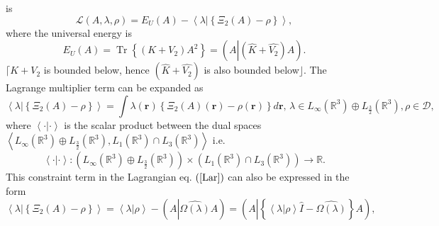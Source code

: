 \documentclass[aps,preprint]{revtex4}%
\begin{document}
is
\begin{equation}
\mathcal{L}\left(  A,\lambda,\rho\right)  =E_{U}\left(  A\right)
-\left\langle \left.  \lambda\right\vert \left\{  \Xi_{2}\left(  A\right)
-\rho\right\}  \right\rangle ,\label{Lar}%
\end{equation}
where the universal energy is
\begin{equation}
E_{U}\left(  A\right)  =\operatorname{Tr}\left\{  \left(  K+V_{2}\right)
A^{2}\right\}  =\left(  A\left\vert \left(  \widehat{K}+\widehat{V_{2}%
}\right)  A\right.  \right)  .
\end{equation}
$\lceil K+V_{2}$ is bounded below, hence $\left(  \widehat{K}+\widehat{V_{2}%
}\right)  $ is also bounded below$\rfloor.$ The Lagrange multiplier term can
be expanded as
\begin{equation}
\left\langle \left.  \lambda\right\vert \left\{  \Xi_{2}\left(  A\right)
-\rho\right\}  \right\rangle =\int\lambda\left(  \boldsymbol{r}\right)
\left\{  \Xi_{2}\left(  A\right)  \left(  \boldsymbol{r}\right)  -\rho\left(
\boldsymbol{r}\right)  \right\}  d\boldsymbol{r},\boldsymbol{\,}\lambda\in
L_{\infty}\left(  \mathbb{R}^{3}\right)  \oplus L_{\frac{3}{2}}\left(
\mathbb{R}^{3}\right)  ,\rho\in\mathcal{D},
\end{equation}
where $\left\langle \cdot|\cdot\right\rangle $ is the scalar product between
the dual spaces $\left\langle L_{\infty}\left(  \mathbb{R}^{3}\right)  \oplus
L_{\frac{3}{2}}\left(  \mathbb{R}^{3}\right)  ,L_{1}\left(  \mathbb{R}%
^{3}\right)  \cap L_{3}\left(  \mathbb{R}^{3}\right)  \right\rangle $ i.e.
\begin{equation}
\left\langle \cdot|\cdot\right\rangle :\left(  L_{\infty}\left(
\mathbb{R}^{3}\right)  \oplus L_{\frac{3}{2}}\left(  \mathbb{R}^{3}\right)
\right)  \times\left(  L_{1}\left(  \mathbb{R}^{3}\right)  \cap L_{3}\left(
\mathbb{R}^{3}\right)  \right)  \rightarrow\mathbb{R}.
\end{equation}
This constraint term in the Lagrangian eq. $\left(  \ref{Lar}\right)  $ can
also be expressed in the form
\begin{equation}
\left\langle \left.  \lambda\right\vert \left\{  \Xi_{2}\left(  A\right)
-\rho\right\}  \right\rangle =\left\langle \lambda\left\vert \rho\right.
\right\rangle -\left(  A\left\vert \widehat{\Omega\left(  \lambda\right)
}\right.  A\right)  =\left(  A\left\vert \left\{  \left\langle \lambda
\left\vert \rho\right.  \right\rangle \hat{I}-\widehat{\Omega\left(
\lambda\right)  }\right\}  \right.  A\right)  ,
\end{equation}
\end{document}
